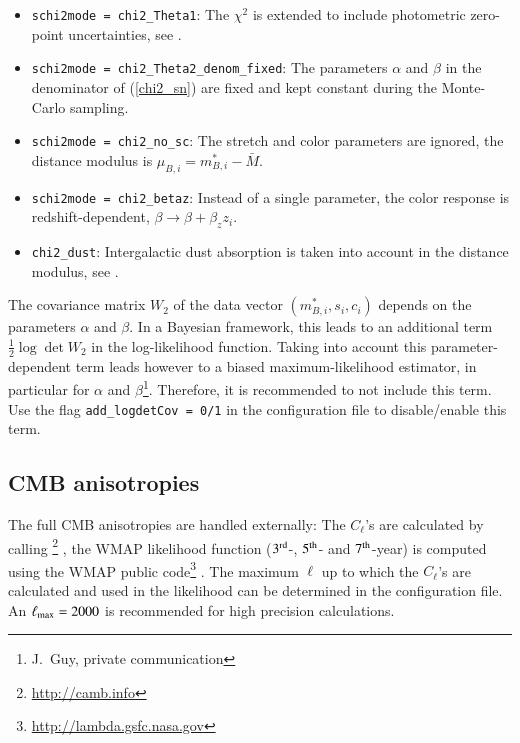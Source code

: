 \documentclass[11pt, chapterprefix, headsepline]{scrartcl}
\begin{document}
\begin{itemize}

  \item \texttt{schi2mode = chi2\_Theta1}: The $\chi^2$ is
    extended to include photometric zero-point uncertainties, see \cite{KB09}.

  \item \texttt{schi2mode = chi2\_Theta2\_denom\_fixed}: The
    parameters $\alpha$ and $\beta$ in the denominator of
    (\ref{chi2_sn}) are fixed and kept constant during the Monte-Carlo
    sampling.

  \item \texttt{schi2mode = chi2\_no\_sc}: The stretch and color
    parameters are ignored, the distance modulus is $\mu_{B, i} =
    m_{B, i}^* - \bar M$.

    \item \texttt{schi2mode = chi2\_betaz}: Instead of a single
      parameter, the color response is redshift-dependent, $\beta
      \rightarrow \beta +
      \beta_z z_i$.

    \item \texttt{chi2\_dust}: Intergalactic dust absorption is taken
      into account in the distance modulus, see \cite{MKS10}.


\end{itemize}

The covariance matrix $W_2$ of the data vector $(m_{B,i}^*, s_i, c_i)$
depends on the parameters $\alpha$ and $\beta$. In a
Bayesian framework, this leads to an additional term $\frac 1 2 \log
\det W_2$ in the log-likelihood
function. Taking into account this
parameter-dependent term leads however to a biased maximum-likelihood
estimator, in particular for  $\alpha$ and $\beta$\footnote{J.~Guy,
  private communication}. Therefore, it is recommended to not include
this term. Use the flag \texttt{add\_logdetCov = 0/1} in the 
configuration file to disable/enable this term.


\subsection{CMB anisotropies}


The full CMB anisotropies are handled externally: The $C_\ell$'s are
calculated by calling
\footnote{\url{http://camb.info}} \citep{Lewis:1999bs}, the WMAP
likelihood function ($3^{\rm rd}$-, $5^{\rm th}$- and $7^{\rm
  th}$-year) is computed using the WMAP public
code\footnote{\url{http://lambda.gsfc.nasa.gov}}
\citep{WMAP5-Dunkley08}.
The maximum $\ell$ up to which the $C_\ell$'s are calculated and used
in the likelihood can be determined in the configuration file. An
$\ell_{\rm max} = 2000$ is recommended for high precision
calculations.
\end{document}
